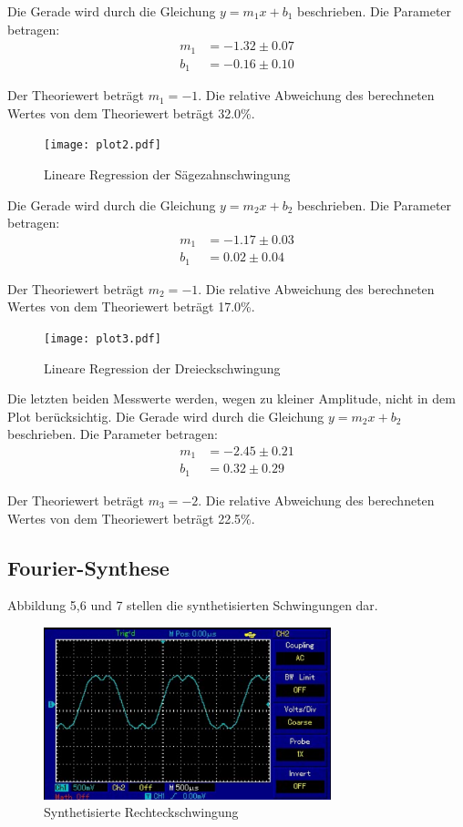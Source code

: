 Die Gerade wird durch die Gleichung $y = m_1x + b_1$ beschrieben. Die Parameter betragen:
\begin{align*}
  m_1 &= -1.32 \pm 0.07 \\
  b_1 &= -0.16 \pm 0.10
\end{align*}

Der Theoriewert beträgt $m_1=-1$. Die relative Abweichung des berechneten Wertes von dem Theoriewert beträgt 32.0\%.

\begin{figure}
  \centering
  \texttt{[image: plot2.pdf]}
  \caption{Lineare Regression der Sägezahnschwingung}
  \label{fig:saegezahn}
\end{figure}

Die Gerade wird durch die Gleichung $y = m_2x + b_2$ beschrieben. Die Parameter betragen:
\begin{align*}
  m_1 &= -1.17 \pm 0.03 \\
  b_1 &= 0.02 \pm 0.04
\end{align*}

Der Theoriewert beträgt $m_2=-1$. Die relative Abweichung des berechneten Wertes von dem Theoriewert beträgt 17.0\%.

\begin{figure}[H]
  \centering
  \texttt{[image: plot3.pdf]}
  \caption{Lineare Regression der Dreieckschwingung}
  \label{fig:dreieck}
\end{figure}

Die letzten beiden Messwerte werden, wegen zu kleiner Amplitude, nicht in dem Plot berücksichtig.
Die Gerade wird durch die Gleichung $y = m_2x + b_2$ beschrieben. Die Parameter betragen:
\begin{align*}
  m_1 &= -2.45 \pm 0.21 \\
  b_1 &= 0.32 \pm 0.29
\end{align*}

Der Theoriewert beträgt $m_3=-2$. Die relative Abweichung des berechneten Wertes von dem Theoriewert beträgt 22.5\%.

\subsection{Fourier-Synthese}
Abbildung 5,6 und 7 stellen die synthetisierten Schwingungen dar.

\begin{figure}[H]
  \centering
  \includegraphics[height=5cm]{rechteck.PNG}
  \caption{Synthetisierte Rechteckschwingung}
  \label{fig:rechteck}
\end{figure}


